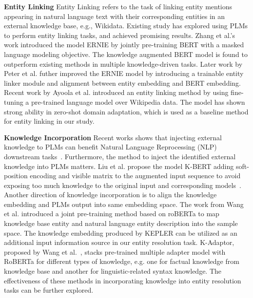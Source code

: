 \textbf{Entity Linking}
Entity Linking \cite{li_deep_2020} refers to the task of linking entity mentions appearing in natural language text with their corresponding entities in an external knowledge base, e.g., Wikidata. 
Existing study has explored using PLMs to perform entity linking tasks, and achieved promising results. 
Zhang et al.'s work \cite{zhang_ernie_2019} introduced the model ERNIE by jointly pre-training BERT with a masked language modeling objective. The knowledge augmented BERT model is found to outperform existing methods in multiple knowledge-driven tasks. 
Later work by Peter et al. \cite{peters_knowledge_2019} futher improved the ERNIE model by introducing a trainable entity linker module and alignment between entity embedding and BERT embedding. 
Recent work by Ayoola et al. \cite{ayoola_refined_2022} introduced an entity linking method by using fine-tuning a pre-trained language model over Wikipedia data. The model has shown strong ability in zero-shot domain adaptation, which is used as a baseline method for entity linking in our study. 

\textbf{Knowledge Incorporation} %
Recent works shows that injecting external knowledge to PLMs can benefit Natural Language Reprocessing (NLP) downstream tasks~\cite{zhang_ernie_2019,peters_knowledge_2019,liu_k-bert_2020,wang_k-adapter_2021, wang_kepler_2021}. Furthermore, the method to inject the identified external knowledge into PLMs matters. Liu et al. propose the model K-BERT adding soft-position encoding and visible matrix to the augmented input sequence to avoid exposing too much knowledge to the original input and corresponding models~\cite{liu_k-bert_2020}. Another direction of knowledge incorporation is to align the knowledge embedding and PLMs output into same embedding space. The work from Wang et al. \cite{wang_kepler_2021} introduced a joint pre-training method based on roBERTa to map knowledge base entity and natural language entity description into the sample space. The knowledge embedding produced by KEPLER can be utilized as an additional input information source in our entity resolution task. K-Adaptor, proposed by Wang et al.~\cite{wang_k-adapter_2021}, stacks pre-trained multiple adapter model with RoBERTa for different types of knowledge, e.g. one for factual knowledge from knowledge base and another for linguistic-related syntax knowledge. The effectiveness of these methods in incorporating knowledge into entity resolution tasks can be further explored.